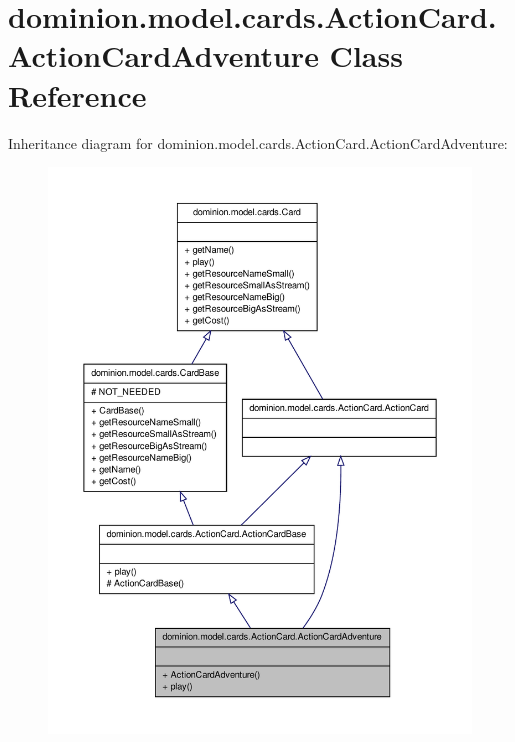 \hypertarget{classdominion_1_1model_1_1cards_1_1ActionCard_1_1ActionCardAdventure}{\section{dominion.\-model.\-cards.\-Action\-Card.\-Action\-Card\-Adventure \-Class \-Reference}
\label{classdominion_1_1model_1_1cards_1_1ActionCard_1_1ActionCardAdventure}
}


\-Inheritance diagram for dominion.\-model.\-cards.\-Action\-Card.\-Action\-Card\-Adventure\-:
\nopagebreak
\begin{figure}[H]
\begin{center}
\leavevmode
\includegraphics[width=350pt]{classdominion_1_1model_1_1cards_1_1ActionCard_1_1ActionCardAdventure__inherit__graph}
\end{center}
\end{figure}


